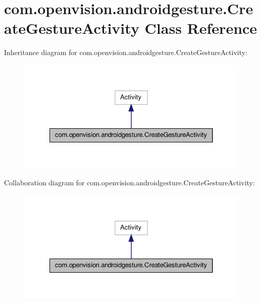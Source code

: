 \hypertarget{classcom_1_1openvision_1_1androidgesture_1_1_create_gesture_activity}{\section{com.\-openvision.\-androidgesture.\-Create\-Gesture\-Activity \-Class \-Reference}
\label{classcom_1_1openvision_1_1androidgesture_1_1_create_gesture_activity}
}


\-Inheritance diagram for com.\-openvision.\-androidgesture.\-Create\-Gesture\-Activity\-:
\nopagebreak
\begin{figure}[H]
\begin{center}
\leavevmode
\includegraphics[width=330pt]{classcom_1_1openvision_1_1androidgesture_1_1_create_gesture_activity__inherit__graph}
\end{center}
\end{figure}


\-Collaboration diagram for com.\-openvision.\-androidgesture.\-Create\-Gesture\-Activity\-:
\nopagebreak
\begin{figure}[H]
\begin{center}
\leavevmode
\includegraphics[width=330pt]{classcom_1_1openvision_1_1androidgesture_1_1_create_gesture_activity__coll__graph}
\end{center}
\end{figure}

